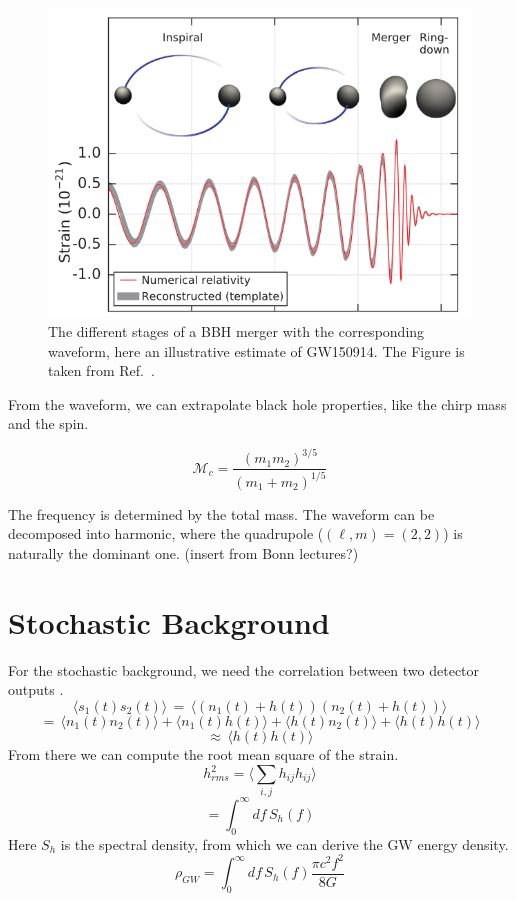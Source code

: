 \begin{figure}[h]
    \centering
    \includegraphics[width=0.7\linewidth]{Images/waveform-abbott.PNG}
    \caption{The different stages of a BBH merger with the corresponding waveform, here an illustrative estimate of GW150914. The Figure is taken from Ref.\ \cite{abbott_observation_2016}.}
    \label{GW_waveform}
\end{figure} 

From the waveform, we can extrapolate black hole properties, like the chirp mass and the spin. 

\begin{equation}
    \mathcal{M}_c = \frac{(m_1m_2)^{3/5}}{(m_1+m_2)^{1/5}}
\end{equation}

The frequency is determined by the total mass. 
The waveform can be decomposed into harmonic, where the quadrupole ($(\ell, m)=(2,2)$) is naturally the dominant one. 
(insert from Bonn lectures?)

\section{Stochastic Background}
For the stochastic background, we need the correlation between two detector
outputs \cite{christensen_stochastic_2019}.
\begin{equation}
    \langle s_1 (t) s_2(t)\rangle \, = \, \langle(n_1(t) + h(t))(n_2(t) + h(t))\rangle
\end{equation}
\begin{equation}
    = \, \langle n_1(t) n_2(t)\rangle + \langle n_1(t)h(t)\rangle + \langle h(t)n_2(t)\rangle  + \langle h(t)h(t)\rangle  
\end{equation}
\begin{equation}
    \approx \, \langle h(t)h(t)\rangle 
\end{equation}
From there we can compute the root mean square of the strain.
\begin{equation}
    h_{rms}^2 = \langle \sum_{i,j} h_{ij} h_{ij}\rangle 
\end{equation}
\begin{equation}
    = \int_0^\infty df \, S_h (f)
\end{equation}
Here $S_h$ is the spectral density, from which we can derive the GW energy
density.
\begin{equation}
    \rho_{GW} = \int_0^\infty df \, S_h(f) \frac{\pi c^2 f^2}{8G}
\end{equation} 
